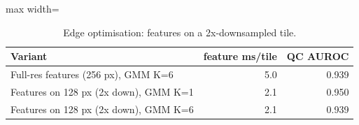 \begin{table}[H]\centering\small
\caption{Edge optimisation: features on a 2x-downsampled tile.}\label{tab:downsample}
\begin{adjustbox}{max width=\linewidth}\begin{tabular}{p{8cm}rr}\toprule
\textbf{Variant} & \textbf{feature ms/tile} & \textbf{QC AUROC} \\\midrule
Full-res features (256 px), GMM K=6 & 5.0 & 0.939 \\
Features on 128 px (2x down), GMM K=1 & 2.1 & 0.950 \\
Features on 128 px (2x down), GMM K=6 & 2.1 & 0.939 \\
\bottomrule\end{tabular}\end{adjustbox}\end{table}